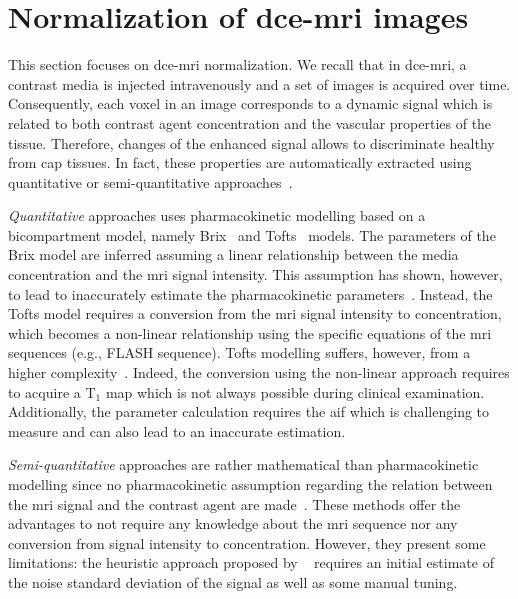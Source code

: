 \section{Normalization of \acs*{dce}-\acs*{mri} images}\label{sec:chp5:DCE-norm}

This section focuses on \ac{dce}-\ac{mri} normalization.
We recall that in \ac{dce}-\ac{mri}, a contrast media is injected intravenously and a set of images is acquired over time.
Consequently, each voxel in an image corresponds to a dynamic signal which is related to both contrast agent concentration and the vascular properties of the tissue.
Therefore, changes of the enhanced signal allows to discriminate healthy from \ac{cap} tissues.
In fact, these properties are automatically extracted using quantitative or semi-quantitative approaches~\cite{Lemaitre2015}.

\emph{Quantitative} approaches uses pharmacokinetic modelling based on a bicompartment model, namely Brix~\cite{brix1991pharmacokinetic} and Tofts~\cite{tofts1995quantitative} models.
The parameters of the Brix model are inferred assuming a linear relationship between the media concentration and the \ac{mri} signal intensity.
This assumption has shown, however, to lead to inaccurately estimate the pharmacokinetic parameters~\cite{heilmann2006determination}.
Instead, the Tofts model requires a conversion from the \ac{mri} signal intensity to concentration, which becomes a non-linear relationship using the specific equations of the \ac{mri} sequences (e.g., FLASH sequence).
Tofts modelling suffers, however, from a higher complexity~\cite{gliozzi2011phenomenological}.
Indeed, the conversion using the non-linear approach requires to acquire a T$_1$ map which is not always possible during clinical examination.
Additionally, the parameter calculation requires the \ac{aif} which is challenging to measure and can also lead to an inaccurate estimation.

\emph{Semi-quantitative} approaches are rather mathematical than pharmacokinetic modelling since no pharmacokinetic assumption regarding the relation between the \ac{mri} signal and the contrast agent are made~\cite{huisman2001accurate,gliozzi2011phenomenological}.
These methods offer the advantages to not require any knowledge about the \ac{mri} sequence nor any conversion from signal intensity to concentration.
However, they present some limitations: the heuristic approach proposed by \citeauthor{huisman2001accurate}~\cite{huisman2001accurate} requires an initial estimate of the noise standard deviation of the signal as well as some manual tuning.

